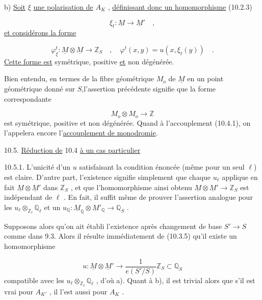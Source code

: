b) \underline{Soit} $\xi$ \underline{une polarisation de} $A_K$ , \underline{définissant donc un homomorphisme} (10.2.3)

\begin{equation*}
\xi_t : \underline{M} \longrightarrow \underline{M}' \quad ,
\end{equation*}
\underline{et considérons la forme}

\begin{equation}\tag{10.4.2}
\varphi_\xi^t : \underline{M} \otimes \underline{M} \longrightarrow \mathbb{Z}_S \quad , \quad \varphi^t(x,y) = u(x,\xi_t(y)) \quad .
\end{equation}
\underline{Cette forme est} symétrique, positive \underline{et} non dégénérée.

Bien entendu, en termes de la fibre géométrique $M_o$ de $\underline{M}$ en un point géométrique donné sur $S$,l'assertion précédente signifie que la forme correspondante

\begin{equation*}
M_o \otimes M_o \longrightarrow \mathbb{Z}
\end{equation*}
est symétrique, positive et non dégénérée. Quand à l'accouplement (10.4.1), on l'appelera encore l'\underline{accouplement de monodromie}.




10.5. \underline{Réduction de} 10.4 \underline{à un cas particulier}

10.5.1. L'unicité d'un $u$ satisfaisant la condition énoncée (même pour un seul $\ell$) est claire. D'autre part, l'existence signifie simplement que chaque $u_\ell$ applique en fait $\underline{M} \otimes \underline{M}'$ dans $\mathbb{Z}_S$ , et que l'homomorphisme ainsi obtenu $\underline{M} \otimes \underline{M}' \longrightarrow \mathbb{Z}_S$ est indépendant de $\ell$ . En fait, il suffit même de prouver l'assertion analogue pour les $u_\ell \otimes_{\mathbb{Z}_\ell} \mathbb{Q}_\ell$ et un $u_{\mathbb{Q}} : \underline{M}_{\mathbb{Q}} \otimes \underline{M}'_{\mathbb{Q}} \longrightarrow \mathbb{Q}_S$ .

Supposons alors qu'on ait établi l'existence après changement de base $S' \longrightarrow S$ comme dans 9.3. Alors il résulte immédiatement de (10.3.5) qu'il existe un homomorphisme

\begin{equation*}
u : \underline{M} \otimes \underline{M}' \longrightarrow \frac{1}{e(S'/S)} \mathbb{Z}_S \subset \mathbb{Q}_S
\end{equation*}
compatible avec les $u_\ell \otimes_{\mathbb{Z}_\ell} \mathbb{Q}_\ell$ , d'où a). Quant à b), il est trivial alors que s'il est vrai pour $A_{K'}$ , il l'est aussi pour $A_K$ .

